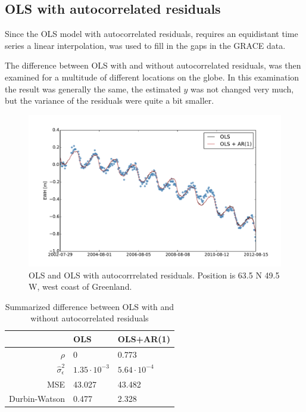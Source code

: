 
\subsection{OLS with autocorrelated residuals}
\label{section:result-ols-ar}

Since the OLS model with autocorrelated residuals, requires an equidistant time series a linear interpolation, was used to fill in the gaps in the GRACE data. 

The difference between OLS with and without autocorrelated residuals, was then examined for a multitude of different locations on the globe. In this examination the result was generally the same, the estimated $\hat{y}$ was not changed very much, but the variance of the residuals were quite a bit smaller.

\begin{figure}[H]
\centering
\includegraphics[width=1.0\textwidth]{figures/ar-compare}
\caption{OLS and OLS with autocorrrelated residuals. Position is 63.5 N 49.5 W, west coast of Greenland.}
\label{fig:ar-compare}
\end{figure}

\begin{table}[H]
\centering
\begin{tabular}{r | l l}
                             & OLS    & OLS+AR(1) \\ \hline
$\rho$		 & 0          & 0.773 \\
$\hat{\sigma}_\epsilon^2$ & $1.35 \cdot 10^{-3}$ & $ 5.64 \cdot 10^{-4}$ \\
MSE                   & 43.027 & 43.482 \\
Durbin-Watson & 0.477 & 2.328
\end{tabular}
\caption{Summarized difference between OLS with and without autocorrelated residuals}
\label{table:ar-compare}
\end{table}

